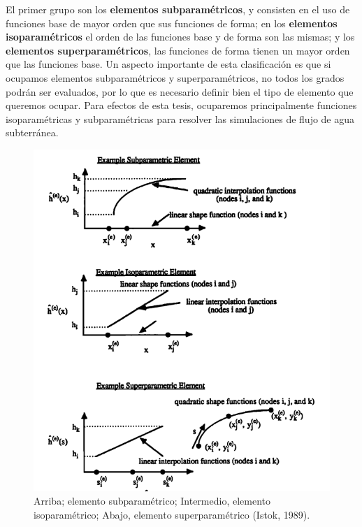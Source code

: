 El primer grupo son los \textbf{elementos subparamétricos}, y consisten en el uso de funciones base de mayor orden que sus funciones de forma; en los \textbf{elementos isoparamétricos} el orden de las funciones base y de forma son las mismas; y los \textbf{elementos superparamétricos}, las funciones de forma tienen un mayor orden que las funciones base. Un aspecto importante de esta clasificación es que si ocupamos elementos subparamétricos y superparamétricos, no todos los grados podrán ser evaluados, por lo que es necesario definir bien el tipo de elemento que queremos ocupar. Para efectos de esta tesis, ocuparemos principalmente funciones isoparamétricas y subparamétricas para resolver las simulaciones de flujo de agua subterránea.
\\
\begin{figure}[ht!]
\centering
\includegraphics[scale=0.8]{Figura_18.png}
\caption{ Arriba; elemento subparamétrico; Intermedio, elemento isoparamétrico; Abajo, elemento superparamétrico (Istok, 1989).}
\label{Figura18:2}
\end{figure}

